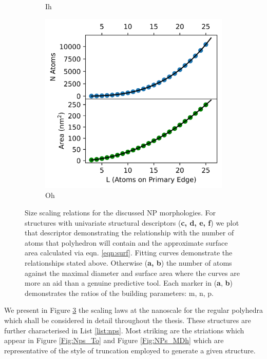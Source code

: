 \begin{figure}
\begin{subfigure}[b]{0.425\textwidth}
    \caption{Ih}
    \label{Fig:NPs_Ih}
    \end{subfigure}
\begin{subfigure}[b]{0.425\textwidth}
    \includegraphics[width=\textwidth]{figures/Theory/Oh_Sizes.png}
    \caption{Oh}
    \label{Fig:NPs_Oh}
    \end{subfigure}
    \caption{Size scaling relations for the discussed NP morphologies. For structures with univariate structural descriptors (\textbf{c, d, e, f}) we plot that descriptor demonstrating the relationship with the number of atoms that polyhedron will contain and the approximate surface area calculated via eqn. \ref{eqn:surf}. Fitting curves demonstrate the relationships stated above. Otherwise (\textbf{a, b}) the number of atoms against the maximal diameter and surface area where the curves are more an aid than a genuine predictive tool. Each marker in (\textbf{a}, \textbf{b}) demonstrates the ratios of the building parameters: m, n, p.}
    \label{Fig:nanoparticles_sizes}
\end{figure}

We present in Figure \ref{Fig:nanoparticles_sizes} the scaling laws at the nanoscale for the regular polyhedra which shall be considered in detail throughout the thesis. These structures are further characterised in List \ref{list:nps}. Most striking are the striations which appear in Figure \ref{Fig:Nps_To} and Figure \ref{Fig:NPs_MDh} which are representative of the style of truncation employed to generate a given structure.

